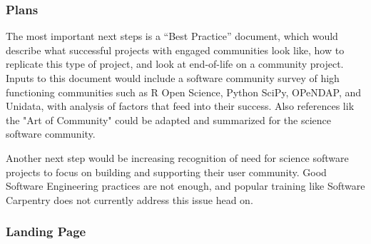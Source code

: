 \subsubsection{Plans}

The most important next steps is a ``Best Practice'' document, which would describe what successful projects with engaged
communities look like, how to replicate this type of project, and look at end-of-life on a community project. Inputs to this
document would include a software community survey of high functioning communities such as R Open Science, Python SciPy,
OPeNDAP, and Unidata, with analysis of factors that feed into their success. Also references lik the "Art of Community" could
be adapted and summarized for the science software community.

Another next step would be increasing recognition of need for science software projects to focus on building and supporting
their user community. Good Software Engineering practices are not enough, and popular training like Software Carpentry does
not currently address this issue head on.

\subsubsection{Landing Page}
